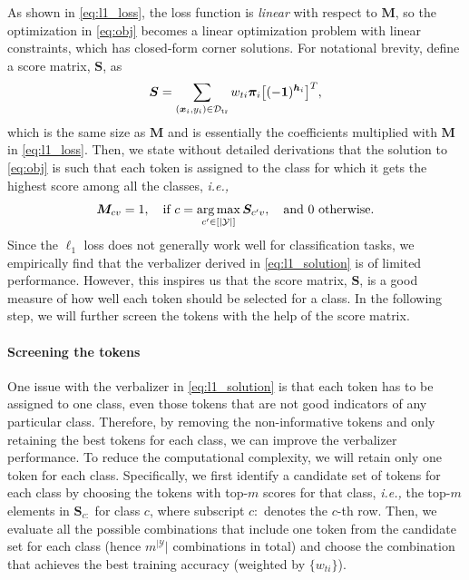 \documentclass{article}
\theoremstyle{plain}
\theoremstyle{definition}
\theoremstyle{remark}
\begin{document}
As shown in \eqref{eq:l1_loss}, the loss function is \emph{linear} with respect to $\bm M$, so the optimization in \eqref{eq:obj} becomes a linear optimization problem with linear constraints, which has closed-form corner solutions. For notational brevity, define a score matrix, $\bm S$, as
\begin{equation}
    \small
    \bm S = \sum_{(\bm x_i, y_i) \in \mathcal{D}_{\mathrm{tr}}} w_{ti} \bm \pi_i \big[(-\bm{1})^{\bm h_i}\big]^T,
\end{equation}
which is the same size as $\bm M$ and is essentially the coefficients multiplied with $\bm M$ in \eqref{eq:l1_loss}. Then, we state without detailed derivations that the solution to \eqref{eq:obj} is such that each token is assigned to the class for which it gets the highest score among all the classes, \emph{i.e.,}
\begin{equation}
    \bm M_{cv} = 1, \quad \mbox{if } c = \operatorname*{arg\,max}_{c'\in[|\mathcal{Y}|]} \bm S_{c'v}, \quad \mbox{and } 0 \mbox{ otherwise}.
    \label{eq:l1_solution}
\end{equation}
Since the $\ell_1$ loss does not generally work well for classification tasks, we empirically find that the verbalizer derived in \eqref{eq:l1_solution} is of limited performance. However, this inspires us that the score matrix, $\bm S$, is a good measure of how well each token should be selected for a class. In the following step, we will further screen the tokens with the help of the score matrix.

\paragraph{Screening the tokens} 
One issue with the verbalizer in \eqref{eq:l1_solution} is that each token has to be assigned to one class, even those tokens that are not good indicators of any particular class. Therefore, by removing the non-informative tokens and only retaining the best tokens for each class, we can improve the verbalizer performance. To reduce the computational complexity, we will retain only one token for each class. Specifically, we first identify a candidate set of tokens for each class by choosing the tokens with top-$m$ scores for that class, \emph{i.e.,} the top-$m$ elements in $\bm S_{c:}$ for class $c$, where subscript $c\colon$ denotes the $c$-th row. Then, we evaluate all the possible combinations that include one token from the candidate set for each class (hence $m^{|\mathcal{Y}}|$ combinations in total) and choose the combination that achieves the best training accuracy (weighted by $\{w_{ti}\}$).
\end{document}
